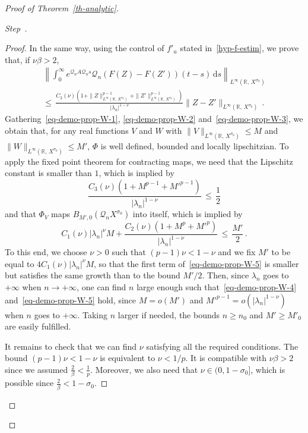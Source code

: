\documentclass[10pt]{amsart}
\theoremstyle{definition}\newtheorem{defi}[theo]{Definition}\newtheorem{rema}[theo]{Remark}\newtheorem{exam}[theo]{Example}\newtheorem{exem}[theo]{Example}\newtheorem{nota}[theo]{Notation}
\newcommand{\RR}{\mathbb{R}}
\newcommand{\Qc}{\mathcal{Q}}
\newcommand{\drm}{\mathrm{d}}
\newcounter{stepcount}
\newenvironment{step}{\refstepcounter{stepcount}\begin{proof}[Step~\thestepcount]}{\let\qed\relax\end{proof}}
\begin{document}
\begin{proof}[{Proof of Theorem~\ref{th-analytic}}]
\begin{step}
\begin{proof}
In the same way, using the control of $f'_u$ stated in~\eqref{hyp-f-estim}, we prove that, if $\nu\beta>2$,
\begin{multline}\label{eq-demo-prop-W-3}
\left\| \int_0^\infty e^{\Qc_n A\Qc_n s}\Qc_n \left(F(Z)-F(Z')\right)(t-s)\,\drm s\right\|_{L^\infty(\RR,\,X^{\sigma_0})}\\
\leq\,\frac{C_3(\nu)\left(1+\|Z\|_{ L^\infty(\RR,\,X^{\sigma_0})}^{p-1}+\|Z'\|_{ L^\infty(\RR,\,X^{\sigma_0})}^{p-1}\right)}{|\lambda_n|^{ 1-\nu}}\|Z-Z'\|_{ L^\infty(\RR,\, X^{\sigma_0})}\,.
\end{multline}
Gathering~\eqref{eq-demo-prop-W-1}, \eqref{eq-demo-prop-W-2} and~\eqref{eq-demo-prop-W-3}, we obtain that, for any real functions $V$ and $W$ with $\|V\|_{ L^\infty(\RR,\,X^{\sigma_0})}\leq M$ and $\|W\|_{ L^\infty(\RR,\,X^{\sigma_0})}\leq M'$, $\Phi$ is well defined, bounded and locally lipschitzian. To apply the fixed point theorem for contracting maps, we need that the Lipschitz constant is smaller than $1$, which is implied by
\begin{equation}\label{eq-demo-prop-W-4}
\frac{C_3(\nu)\left(1+M^{p-1}+{M'}^{p-1}\right)}{ |\lambda_n|^{ 1-\nu}}\,\leq\,\frac 12
\end{equation}
and that $\Phi_V$ maps $B_{M',0}(\Qc_nX^{\sigma_0})$ into itself, which is implied by
\begin{equation}\label{eq-demo-prop-W-5}
C_1(\nu)|\lambda_n|^{\nu} M +
\frac{C_2(\nu)\left(1+M^p+{M'}^p\right) } {|\lambda_n|^{ 1-\nu}}\,\leq\,\frac{M'}2\,.
\end{equation}
To this end, we choose $\nu>0$ such that $(p-1)\nu < 1-\nu$ and we fix $M'$ to be equal to $4C_1(\nu)|\lambda_n|^\nu M$, so that the first term of~\eqref{eq-demo-prop-W-5} is smaller but satisfies the same growth than to the bound $M'/2$. Then, since $\lambda_n$ goes to $+\infty$ when $n\rightarrow +\infty$, one can find $n$ large enough such that~\eqref{eq-demo-prop-W-4} and~\eqref{eq-demo-prop-W-5} hold, since $M=o(M')$ and ${M'}^{p-1}=o(|\lambda_n|^{1-\nu})$ when $n$ goes to $+\infty$. Taking $n$ larger if needed, the bounds $n\geq n_0$ and $M'\geq M'_0$ are easily fulfilled.

It remains to check that we can find $\nu$ satisfying all the required conditions. The bound $(p-1)\nu < 1-\nu$ is equivalent to $\nu<1/p$. It is compatible with $\nu\beta>2$ since we assumed $\frac{2}{\beta}<\frac{1}{p}$. Moreover, we also need that $\nu\in (0,1-\sigma_0]$, which is possible since $\frac{2}{\beta}< 1-\sigma_0$.



\end{proof}
\end{step}
\end{proof}
\end{document}
